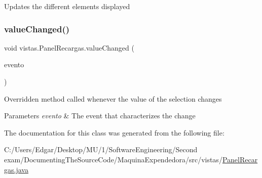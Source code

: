 Updates the different elements displayed \mbox{\label{classvistas_1_1_panel_recargas_af1bcd93b4a920d7cafaf6488af2cb6f4}} 
\subsubsection{\texorpdfstring{value\+Changed()}{valueChanged()}}
{\footnotesize\ttfamily void vistas.\+Panel\+Recargas.\+value\+Changed (\begin{DoxyParamCaption}\item[{List\+Selection\+Event}]{evento }\end{DoxyParamCaption})\hspace{0.3cm}{\ttfamily [inline]}}

Overridden method called whenever the value of the selection changes 
\begin{DoxyParams}{Parameters}
{\em evento} & The event that characterizes the change \\
\hline
\end{DoxyParams}


The documentation for this class was generated from the following file\+:\begin{DoxyCompactItemize}
\item 
C\+:/\+Users/\+Edgar/\+Desktop/\+M\+U/1/\+Software\+Engineering/\+Second exam/\+Documenting\+The\+Source\+Code/\+Maquina\+Expendedora/src/vistas/\mbox{\hyperlink{_panel_recargas_8java}{Panel\+Recargas.\+java}}\end{DoxyCompactItemize}
